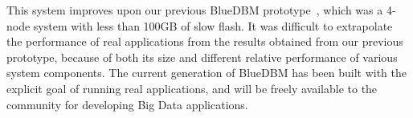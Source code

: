 This system improves upon our previous BlueDBM prototype~\cite{bluedbm}, which was a 4-node system with less than 100GB of slow flash. 
It was difficult to extrapolate the performance of real applications from the
results obtained from our previous prototype, because of both its size and
different relative performance of various system components. The current
generation of BlueDBM has been built with the explicit goal of running real applications, and will be freely available to the community for developing Big Data applications.


